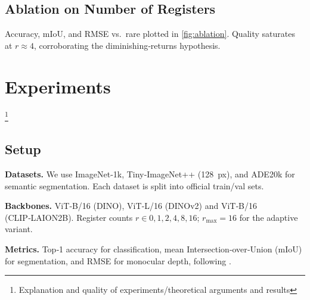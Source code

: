 \documentclass{article}
\newcommand{\RegTok}{\texttt{[REG]}\xspace}
\newcommand{\nreg}{r}
\begin{document}

\subsection{Ablation on Number of Registers}
Accuracy, mIoU, and RMSE vs. \nreg are plotted in \cref{fig:ablation}.  Quality saturates at $\nreg\approx4$, corroborating the diminishing‑returns hypothesis.


\section{Experiments}
\label{sec:experiments}
\footnote{Explanation and quality of experiments/theoretical arguments and results}
\subsection{Setup}
\textbf{Datasets.}  We use ImageNet‑1k, Tiny‑ImageNet++ (\SI{128}{px}), and ADE20k for semantic segmentation.  Each dataset is split into official train/val sets.

\textbf{Backbones.}  ViT‑B/16 (DINO), ViT‑L/16 (DINOv2) and ViT‑B/16 (CLIP‑LAION2B).  Register counts $\nreg\in{0,1,2,4,8,16}$; $\nreg_{\max}=16$ for the adaptive variant.

\textbf{Metrics.}  Top‑1 accuracy for classification, mean Intersection‑over‑Union (mIoU) for segmentation, and RMSE for monocular depth, following \cite{darcetVisionTransformersNeed2024}.

\end{document}
